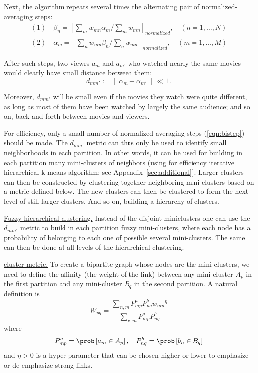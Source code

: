 \documentclass{article} %
\begin{document}
Next, the algorithm repeats several times the alternating pair of normalized-averaging steps:
\begin{equation}
\begin{split}
(1) \quad \beta_n = \left[ \sum_m w_{mn} \alpha_m / \sum_m w_{mn} \right]_{normalized}, \quad (n=1,\ldots,N) \\
(2) \quad \alpha_m = \left[ \sum_n w_{mn} \beta_n / \sum_n w_{mn} \right]_{normalized}, \quad (m=1,\ldots,M) 
\end{split}
\label{eqn:bistep}
\end{equation}

After such steps, two viewrs $a_m$ and $a_{m'}$ who watched nearly the same movies would clearly have small distance between them:
\begin{equation}
d_{mm'} := \|\alpha_m - \alpha_{m'} \| \ll 1\,.
\end{equation}

Moreover, $d_{mm'}$ will be small even if the movies they watch were quite different, as long as most of them have been watched by largely the same audience; and so on, back and forth between movies and viewers.

For efficiency, only a small number of normalized averaging steps (\ref{eqn:bistep}) should be made. The $d_{mm'}$ metric can thus only be used to identify small neighborhoods in each partition. In other words, it can be used for building in each partition many \underline{mini-clusters} of neighbors (using for efficiency iterative hierarchical k-means algorithm; see Appendix~\ref{sec:additional}). Larger clusters can then be constructed by clustering together neighboring mini-clusters based on a metric defined below. The new clusters can then be clustered to form the next level of still larger clusters. And so on, building a hierarchy of clusters.

\underline{Fuzzy hierarchical clustering.} Instead of the disjoint miniclusters one can use the $d_{mm'}$ metric to build in each partition \underline{fuzzy} mini-clusters, where each node has a \underline{probability} of belonging to each one of possible \underline{several} mini-clusters. The same can then be done at all levels of the hierarchical clustering. 

\underline{cluster metric.} To create a bipartite graph whose nodes are the mini-clusters, we need to define  the affinity (the weight of the link) between any mini-cluster $A_p$ in the first partition and any mini-cluster $B_q$ in the second partition. A natural definition is
\begin{equation}
W_{pq} = \frac{\sum_{n,m} P^a_{mp}P^b_{nq}{w_{mn}}^\eta}{ \sum_{n,m}P^a_{mp}P^b_{nq}}
\label{eqn:b2}
\end{equation}
where
\begin{equation}
P^a_{mp} = \prob \left[a_m \in A_p\right], \quad P^b_{nq} = \prob \left[ b_n \in B_q \right]
\end{equation}
and $\eta>0$ is a hyper-parameter that can be chosen higher or lower to emphasize or de-emphasize strong links.
\end{document}
